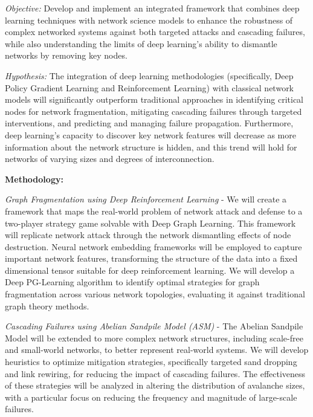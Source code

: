 \begin{outline-of-proposed-research}
\vspace{-1.0em}
\textit{Objective:} Develop and implement an integrated framework that combines deep learning techniques with network science models to enhance the robustness of complex networked systems against both targeted attacks and cascading failures, while also understanding the limits of deep learning's ability to dismantle networks by removing key nodes.

\textit{Hypothesis:} The integration of deep learning methodologies (specifically, Deep Policy Gradient Learning and Reinforcement Learning) with classical network models will significantly outperform traditional approaches in identifying critical nodes for network fragmentation, mitigating cascading failures through targeted interventions, and predicting and managing failure propagation. Furthermore, deep learning's capacity to discover key network features will decrease as more information about the network structure is hidden, and this trend will hold for networks of varying sizes and degrees of interconnection.

\textbf{Methodology:}

\vspace{-1.0em}
\textit{Graph Fragmentation using Deep Reinforcement Learning} - We will create a framework that maps the real-world problem of network attack and defense to a two-player strategy game solvable with Deep Graph Learning. This framework will replicate network attack through the network dismantling effects of node destruction. Neural network embedding frameworks will be employed to capture important network features, transforming the structure of the data into a fixed dimensional tensor suitable for deep reinforcement learning. We will develop a Deep PG-Learning algorithm to identify optimal strategies for graph fragmentation across various network topologies, evaluating it against traditional graph theory methods.

\textit{Cascading Failures using Abelian Sandpile Model (ASM)} - The Abelian Sandpile Model \cite{bak1987, bak1988} will be extended to more complex network structures,\cite{Christensen1993} including scale-free and small-world networks, to better represent real-world systems. We will develop heuristics to optimize mitigation strategies, specifically targeted sand dropping and link rewiring, for reducing the impact of cascading failures. The effectiveness of these strategies will be analyzed in altering the distribution of avalanche sizes, with a particular focus on reducing the frequency and magnitude of large-scale failures.


\end{outline-of-proposed-research}
